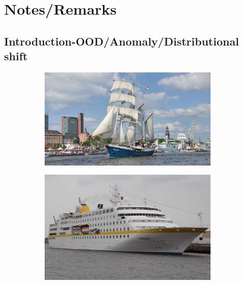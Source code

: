 

\chapter{Notes/Remarks}

\section{Introduction-OOD/Anomaly/Distributional shift}
\begin{figure}[h!]
    \begin{subfigure}{0.333\textwidth}
        \centering
        \includegraphics[height=0.15\textheight,width=0.95\textwidth]{images/intro_ood_anomaly/old_ship.jpg}
        \caption{}
        \label{fig:old_ship}
    \end{subfigure}
    \begin{subfigure}{0.333\textwidth}
        \centering
        \includegraphics[height=0.15\textheight,width=0.95\textwidth]{images/intro_ood_anomaly/Trainer_cruiser.jpeg}
        \caption{}
        \label{fig:trian_cruiser}

\end{subfigure}
\end{figure}
